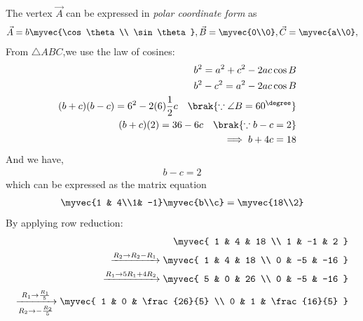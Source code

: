\documentclass[journal,12pt,twocolumn]{IEEEtran}
\begin{document}
The vertex  $\vec{A}$ can  be expressed  in {\em polar coordinate form} as
\begin{align}
\vec{A} = b\myvec{\cos \theta\\  \sin \theta} ,\vec{B} = \myvec{0\\0},\vec{C} = \myvec{a\\0},
\end{align}
From $\triangle ABC$,we use the law of cosines: 
\begin{align}
b^2 = a^2 + c^2 - 2ac \cos B
\\
b^2 - c^2 = a^2 - 2ac \cos B &
\\
(b+c)(b-c) =6^2 - 2(6)\frac{1}{2}c \quad \brak{\because \angle B = 60^{\degree}}
\\
(b+c)(2)=36-6c \quad \brak{\because b-c = 2}
\\
\implies b+4c =18
\end{align}
And we have,
\begin{align}
b-c = 2
\end{align}
which can be expressed as the matrix equation
\begin{align}
\myvec{1 & 4\\1& -1}\myvec{b\\c} = \myvec{18\\2}
\end{align}
By applying row reduction:
\begin{align}
\myvec{
1 & 4  & 18 
\\
1 & -1   & 2 
}
\\
  \xrightarrow{R_2\rightarrow R_2-R_1}
\myvec{
1 & 4  & 18
\\
0 & -5   & -16 
} 
\\
  \xrightarrow{R_1\rightarrow 5R_1+4R_2} 
\myvec{
5 & 0   & 26 
\\
0 & -5  & -16 
}
\\
 \xrightarrow[R_2 \rightarrow -\frac{R_2}{5}]{R_1\rightarrow \frac{R_1}{5}} 
\myvec{
1 & 0   & \frac{26}{5} 
\\
0 & 1   & \frac{16}{5}
}
\end{align}
\end{document}
